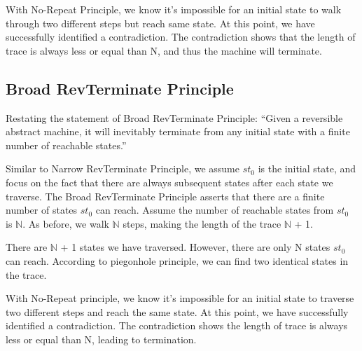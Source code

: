 

With No-Repeat Principle, we know it's impossible for an initial state to walk through two different steps but reach same state.
At this point, we have successfully identified a contradiction.  
The contradiction shows that the length of trace is always less or equal than N, and thus the machine will terminate.

\subsection{ Broad RevTerminate Principle }
Restating the statement of Broad RevTerminate Principle: 
``Given a reversible abstract machine, it will inevitably terminate from any initial state with a finite number of reachable states.''

Similar to Narrow RevTerminate Principle, we assume $st_{0}$ is the initial state, and focus on the fact that there are always subsequent states after each state we traverse.
The Broad RevTerminate Principle asserts that there are a finite number of states $st_{0}$ can reach. 
Assume the number of reachable states from $st_{0}$ is $\mathbb{N}$.
As before, we walk $\mathbb{N}$ steps, making the length of the trace $\mathbb{N}$ + 1.



There are $\mathbb{N}$ + 1 states we have traversed.  However, there are only N states $st_{0}$ can reach.
According to piegonhole principle, we can find two identical states in the trace.



With No-Repeat principle, we know it's impossible for an initial state to traverse two different steps and reach the same state.
At this point, we have successfully identified a contradiction.  The contradiction shows the length of trace is always less or equal than N, leading to termination.

